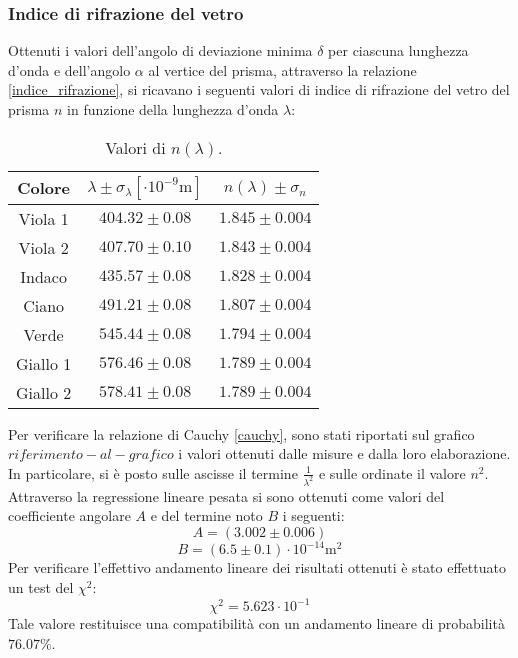 \documentclass[]{article}
\begin{document}
    \subsubsection{Indice di rifrazione del vetro}
    Ottenuti i valori dell'angolo di deviazione minima $\delta$ per ciascuna lunghezza d'onda e dell'angolo $\alpha$ al vertice del prisma, attraverso la relazione \ref{indice_rifrazione}, si ricavano i seguenti valori di indice di rifrazione del vetro del prisma $n$ in funzione della lunghezza d'onda $\lambda$:
    \begin{table} [H]
        \centering
        \begin{tabular}{||c|c|c||}
            \hline
            Colore & $\lambda \pm \sigma_{\lambda} [\cdot 10^{-9} \text{m}]$ & $ n(\lambda) \pm \sigma_n $\\
            \hline \hline
            Viola 1  & $404.32 \pm 0.08 $ & $1.845 \pm 0.004$   \\\hline
            Viola 2  & $407.70 \pm 0.10 $ & $1.843 \pm 0.004$    \\\hline
            Indaco   & $435.57 \pm 0.08 $ & $1.828 \pm 0.004$  \\\hline
            Ciano    & $491.21 \pm 0.08 $ & $1.807 \pm 0.004$  \\\hline
            Verde    & $545.44 \pm 0.08 $ & $1.794 \pm 0.004$ \\\hline
            Giallo 1 & $576.46 \pm 0.08 $ & $1.789 \pm 0.004$   \\\hline
            Giallo 2 & $578.41 \pm 0.08 $ & $1.789 \pm 0.004$   \\\hline
        \end{tabular}
        \caption{Valori di $n(\lambda)$.}
        \label{n-values}
    \end{table}
    Per verificare la relazione di Cauchy \ref{cauchy}, sono stati riportati sul grafico $riferimento-al-grafico$ i valori ottenuti dalle misure e dalla loro elaborazione. In particolare, si è posto sulle ascisse il termine $\frac{1}{\lambda^2}$ e sulle ordinate il valore $n^2$. Attraverso la regressione lineare pesata si sono ottenuti come valori del coefficiente angolare $A$ e del termine noto $B$ i seguenti:
    \begin{equation}
        \label{A}
        A = (3.002 \pm 0.006) 
    \end{equation}
    \begin{equation}
        \label{B}
        B = (6.5 \pm 0.1) \cdot 10^{-14} \text{m}^2
    \end{equation}
    Per verificare l'effettivo andamento lineare dei risultati ottenuti è stato effettuato un test del $\chi^2$:
    \begin{equation}
        \label{chi2}
        \chi^2 = 5.623 \cdot 10^{-1} 
    \end{equation}
    Tale valore restituisce una compatibilità con un andamento lineare di probabilità $76.07 \% $.
    
\end{document}
